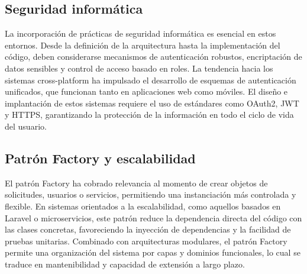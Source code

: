 \subsection{Seguridad informática}

La incorporación de prácticas de seguridad informática es esencial en estos entornos. Desde la definición de la arquitectura hasta la implementación del código, deben considerarse mecanismos de autenticación robustos, encriptación de datos sensibles y control de acceso basado en roles. La tendencia hacia los sistemas cross-platform ha impulsado el desarrollo de esquemas de autenticación unificados, que funcionan tanto en aplicaciones web como móviles. El diseño e implantación de estos sistemas requiere el uso de estándares como OAuth2, JWT y HTTPS, garantizando la protección de la información en todo el ciclo de vida del usuario.

\subsection{Patrón Factory y escalabilidad}

El patrón Factory ha cobrado relevancia al momento de crear objetos de solicitudes, usuarios o servicios, permitiendo una instanciación más controlada y flexible. En sistemas orientados a la escalabilidad, como aquellos basados en Laravel o microservicios, este patrón reduce la dependencia directa del código con las clases concretas, favoreciendo la inyección de dependencias y la facilidad de pruebas unitarias. Combinado con arquitecturas modulares, el patrón Factory permite una organización del sistema por capas y dominios funcionales, lo cual se traduce en mantenibilidad y capacidad de extensión a largo plazo.